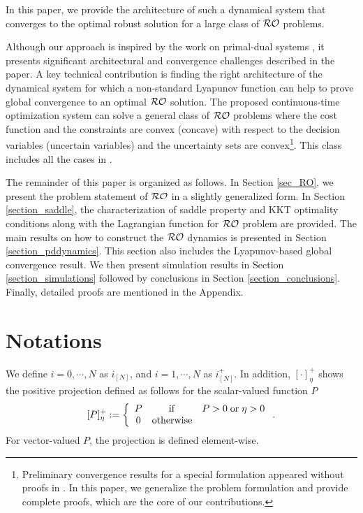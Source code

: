 \documentclass[journal,twoside,web]{ieeecolor}
\begin{document}
In this paper, we provide the architecture of such a dynamical system that converges to the optimal robust solution for a large class of ${\cal RO}$ problems.

Although our approach is inspired by the work on primal-dual systems \cite{arrow1958,feijer2010}, it presents significant architectural and convergence challenges described in the paper. A key technical contribution is finding the right architecture of the dynamical system for which a non-standard Lyapunov function can help to prove global convergence to an optimal ${\cal RO}$ solution. The proposed continuous-time optimization system can solve a general class of ${\cal RO}$ problems where the cost function and the constraints are convex (concave) with respect to the decision variables (uncertain variables) and the uncertainty sets are convex\footnote{Preliminary convergence results for a special formulation appeared without proofs in \cite{ebrahimi2019continuous}. In this paper, we generalize the problem formulation and provide complete proofs, which are the core of our contributions.}. This class includes all the cases in \cite[~Table 1]{gorissen20152}.

The remainder of this paper is organized as follows. In Section \ref{sec_RO}, we present the problem statement of ${\cal RO}$ in a slightly generalized form. In Section \ref{section_saddle}, the characterization of saddle property and KKT optimality conditions along with the Lagrangian function for ${\cal RO}$ problem are provided. The main results on how to construct the ${\cal RO}$ dynamics is presented in Section \ref{section_pddynamics}. This section also includes the Lyapunov-based global convergence result. We then present simulation results in Section \ref{section_simulations} followed by conclusions in Section \ref{section_conclusions}.
Finally, detailed proofs are mentioned in the Appendix.

\section{Notations}\label{notations}

We define $i=0,\cdots,N$ as $i_{[N]}$, and $i=1,\cdots,N$ as $i^+_{[N]}$. In addition, $\left[\cdot\right]_\eta^+$ shows the positive projection defined as follows for the scalar-valued function $P$
\begin{align} \label{proj}
[P]_\eta^+:=\left\{\begin{array}{ccl}P&{\rm if}& P>0 \;{\rm or} \;\eta>0\\
0&{\rm otherwise}
\end{array}\right..
\end{align}
For vector-valued $P$, the projection is defined element-wise.
\end{document}
